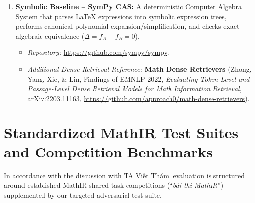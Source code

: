 \documentclass[11pt,a4paper]{article}
\begin{document}
\begin{enumerate}
\begin{itemize}
		\end{itemize}
		\item \textbf{Symbolic Baseline -- SymPy CAS:} A deterministic Computer Algebra System that parses \LaTeX{} expressions into symbolic expression trees, performs canonical polynomial expansion/simplification, and checks exact algebraic equivalence ($\Delta = f_A - f_B = 0$).
		\begin{itemize}
			\item \textit{Repository:} \url{https://github.com/sympy/sympy}.
			\item \textit{Additional Dense Retrieval Reference:} \textbf{Math Dense Retrievers} (Zhong, Yang, Xie, \& Lin, Findings of EMNLP 2022, \textit{Evaluating Token-Level and Passage-Level Dense Retrieval Models for Math Information Retrieval}, arXiv:2203.11163, \url{https://github.com/approach0/math-dense-retrievers}).
		\end{itemize}
	\end{enumerate}

	\section{Standardized MathIR Test Suites and Competition Benchmarks}
	In accordance with the discussion with TA \foreignlanguage{vietnamese}{Viết Thám}, evaluation is structured around established MathIR shared-task competitions (``\textit{bài thi MathIR}'') supplemented by our targeted adversarial test suite.
\end{document}
